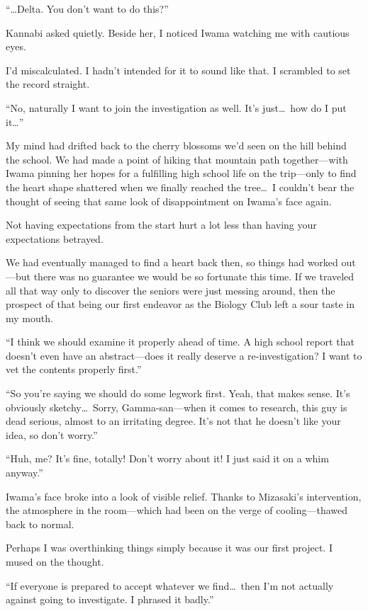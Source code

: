 \documentclass[
    a4paper,
    12pt,
    twoside,
    openany,
    UTF8,
    fontset=windows
]{ctexbook}
\begin{document}
``\dots Delta. You don't want to do this?''

Kannabi asked quietly. Beside her, I noticed Iwama watching me with cautious eyes.

I'd miscalculated. I hadn't intended for it to sound like that. I scrambled to set the record straight.

``No, naturally I want to join the investigation as well. It's just\dots\ how do I put it\dots''

My mind had drifted back to the cherry blossoms we'd seen on the hill behind the school. We had made a point of hiking that mountain path together---with Iwama pinning her hopes for a fulfilling high school life on the trip---only to find the heart shape shattered when we finally reached the tree\dots\ I couldn't bear the thought of seeing that same look of disappointment on Iwama's face again.

Not having expectations from the start hurt a lot less than having your expectations betrayed.

We had eventually managed to find a heart back then, so things had worked out---but there was no guarantee we would be so fortunate this time. If we traveled all that way only to discover the seniors were just messing around, then the prospect of that being our first endeavor as the Biology Club left a sour taste in my mouth.

``I think we should examine it properly ahead of time. A high school report that doesn't even have an abstract---does it really deserve a re-investigation? I want to vet the contents properly first.''

``So you're saying we should do some legwork first. Yeah, that makes sense. It's obviously sketchy\dots\ Sorry, Gamma-san---when it comes to research, this guy is dead serious, almost to an irritating degree. It's not that he doesn't like your idea, so don't worry.''

``Huh, me? It's fine, totally! Don't worry about it! I just said it on a whim anyway.''

Iwama's face broke into a look of visible relief. Thanks to Mizasaki's intervention, the atmosphere in the room---which had been on the verge of cooling---thawed back to normal.

Perhaps I was overthinking things simply because it was our first project. I mused on the thought.

``If everyone is prepared to accept whatever we find\dots\ then I'm not actually against going to investigate. I phrased it badly.''
\end{document}
